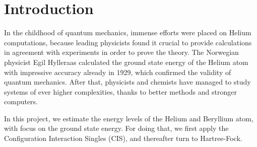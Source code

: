 \section{Introduction} \label{sec:introduction}
In the childhood of quantum mechanics, immense efforts were placed on Helium computations, because leading physicists found it crucial to provide calculations in agreement with experiments in order to prove the theory. The Norwegian physicist Egil Hylleraas calculated the ground state energy of the Helium atom with impressive accuracy already in 1929, which confirmed the validity of quantum mechanics. After that, physicists and chemists have managed to study systems of ever higher complexities, thanks to better methods and stronger computers.

In this project, we estimate the energy levels of the Helium and Beryllium atom, with focus on the ground state energy. For doing that, we first apply the Configuration Interaction Singles (CIS), and thereafter turn to Hartree-Fock. 


